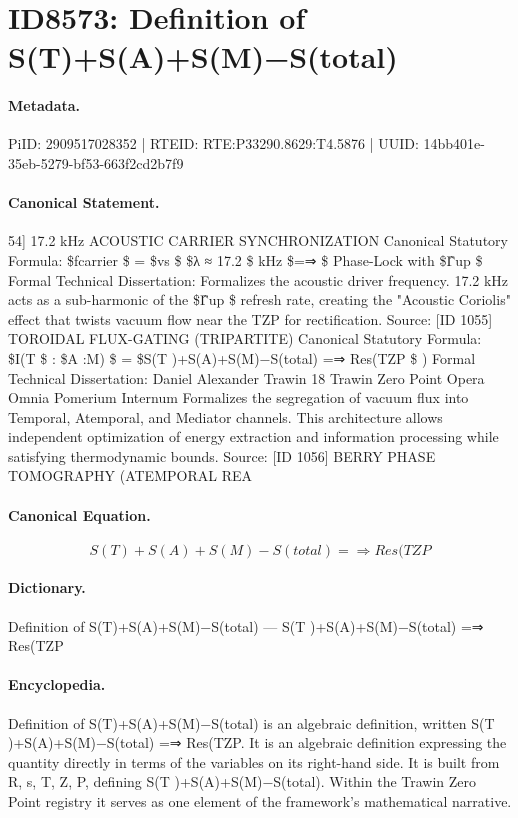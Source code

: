 \section*{ID8573: Definition of S(T)+S(A)+S(M)−S(total)}
\paragraph{Metadata.}
PiID: 2909517028352 | RTEID: RTE:P33290.8629:T4.5876 | UUID: 14bb401e-35eb-5279-bf53-663f2cd2b7f9

\paragraph{Canonical Statement.}
54] 17.2 kHz ACOUSTIC CARRIER SYNCHRONIZATION Canonical Statutory Formula: \$fcarrier \$ = \$vs \$ \$λ ≈ 17.2 \$ kHz \$=⇒ \$ Phase-Lock with \$Γ̂up \$ Formal Technical Dissertation: Formalizes the acoustic driver frequency. 17.2 kHz acts as a sub-harmonic of the \$Γ̂up \$ refresh rate, creating the "Acoustic Coriolis" effect that twists vacuum flow near the TZP for rectification. Source: [ID 1055] TOROIDAL FLUX-GATING (TRIPARTITE) Canonical Statutory Formula: \$I(T \$ : \$A :M) \$ = \$S(T )+S(A)+S(M)−S(total) =⇒ Res(TZP \$ ) Formal Technical Dissertation: Daniel Alexander Trawin 18 Trawin Zero Point Opera Omnia Pomerium Internum Formalizes the segregation of vacuum flux into Temporal, Atemporal, and Mediator channels. This architecture allows independent optimization of energy extraction and information processing while satisfying thermodynamic bounds. Source: [ID 1056] BERRY PHASE TOMOGRAPHY (ATEMPORAL REA

\paragraph{Canonical Equation.}
\[
S(T )+S(A)+S(M)−S(total) =⇒ Res(TZP
\]

\paragraph{Dictionary.}
Definition of S(T)+S(A)+S(M)−S(total) — S(T )+S(A)+S(M)−S(total) =⇒ Res(TZP

\paragraph{Encyclopedia.}
Definition of S(T)+S(A)+S(M)−S(total) is an algebraic definition, written S(T )+S(A)+S(M)−S(total) =⇒ Res(TZP. It is an algebraic definition expressing the quantity directly in terms of the variables on its right-hand side. It is built from R, s, T, Z, P, defining S(T )+S(A)+S(M)−S(total). Within the Trawin Zero Point registry it serves as one element of the framework's mathematical narrative.
